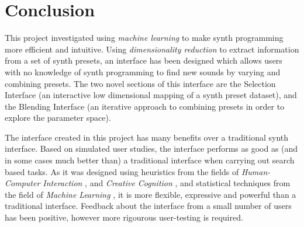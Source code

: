 \documentclass[11pt, oneside]{report}   	%
\begin{document}
%

\chapter{Conclusion}
This project investigated using \emph{machine learning} to make synth programming more efficient and intuitive. Using \emph{dimensionality reduction} to extract information from a set of synth presets, an interface has been designed which allows users with no knowledge of synth programming to find new sounds by varying and combining presets. The two novel sections of this interface are the Selection Interface (an interactive low dimensional mapping of a synth preset dataset), and the Blending Interface (an iterative approach to combining presets in order to explore the parameter space). 

The interface created in this project has many benefits over a traditional synth interface. Based on simulated user studies, the interface performs as good as (and in some cases much better than) a traditional interface when carrying out search based tasks. As it was designed using heuristics from the fields of \emph{Human-Computer Interaction} \cite{MappingStrategies, YeeKing, RatingRanking}, and \emph{Creative Cognition} \cite{TubbThesis}, and statistical techniques from the field of \emph{Machine Learning} \cite{PCA, PreferenceGallery}, it is more flexible, expressive and powerful than a traditional interface. Feedback about the interface from a small number of users has been positive, however more rigourous user-testing is required.
\end{document}
